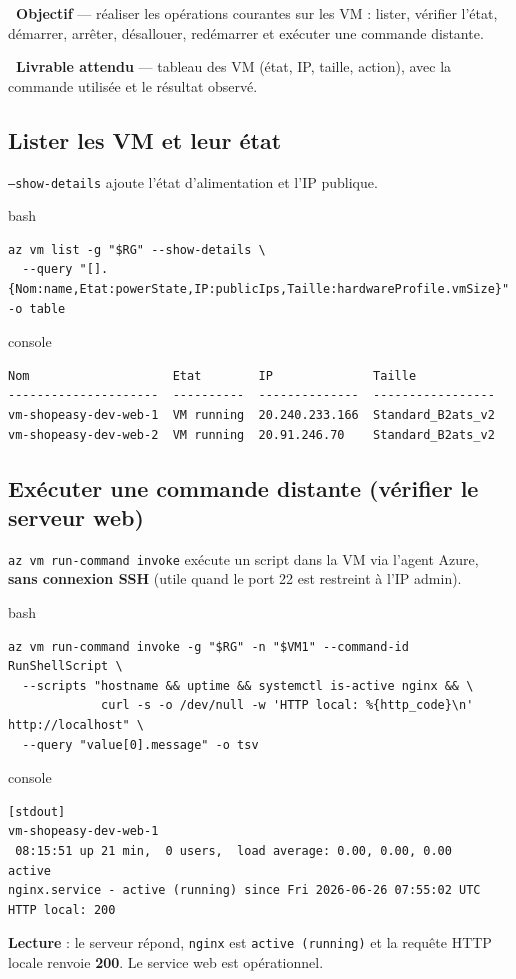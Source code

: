 \documentclass[11pt,a4paper]{article}
\newcommand{\emo}[1]{\raisebox{-0.14em}{\twemoji{#1}}}
\newcommand{\eTarget}{\emo{1f3af}}
\newcommand{\ePackage}{\emo{1f4e6}}
\newcommand{\code}[1]{\texttt{#1}}
\begin{document}
\begin{fiche}
\textbf{\eTarget~Objectif} — réaliser les opérations courantes sur les VM : lister, vérifier l'état, démarrer, arrêter, désallouer, redémarrer et exécuter une commande distante.

\textbf{\ePackage~Livrable attendu} — tableau des VM (état, IP, taille, action), avec la commande utilisée et le résultat observé.
\end{fiche}

\subsection{Lister les VM et leur état}
\code{--show-details} ajoute l'état d'alimentation et l'IP publique.
\begin{codebox}{bash}
\begin{Verbatim}
az vm list -g "$RG" --show-details \
  --query "[].{Nom:name,Etat:powerState,IP:publicIps,Taille:hardwareProfile.vmSize}" -o table
\end{Verbatim}
\end{codebox}
\begin{codebox}{console}
\begin{Verbatim}
Nom                    Etat        IP              Taille
---------------------  ----------  --------------  -----------------
vm-shopeasy-dev-web-1  VM running  20.240.233.166  Standard_B2ats_v2
vm-shopeasy-dev-web-2  VM running  20.91.246.70    Standard_B2ats_v2
\end{Verbatim}
\end{codebox}

\subsection{Exécuter une commande distante (vérifier le serveur web)}
\code{az vm run-command invoke} exécute un script dans la VM via l'agent Azure, \textbf{sans connexion SSH} (utile quand le port 22 est restreint à l'IP admin).
\begin{codebox}{bash}
\begin{Verbatim}
az vm run-command invoke -g "$RG" -n "$VM1" --command-id RunShellScript \
  --scripts "hostname && uptime && systemctl is-active nginx && \
             curl -s -o /dev/null -w 'HTTP local: %{http_code}\n' http://localhost" \
  --query "value[0].message" -o tsv
\end{Verbatim}
\end{codebox}
\begin{codebox}{console}
\begin{Verbatim}
[stdout]
vm-shopeasy-dev-web-1
 08:15:51 up 21 min,  0 users,  load average: 0.00, 0.00, 0.00
active
nginx.service - active (running) since Fri 2026-06-26 07:55:02 UTC
HTTP local: 200
\end{Verbatim}
\end{codebox}
\textbf{Lecture} : le serveur répond, \code{nginx} est \code{active (running)} et la requête HTTP locale renvoie \textbf{200}. Le service web est opérationnel.
\end{document}
